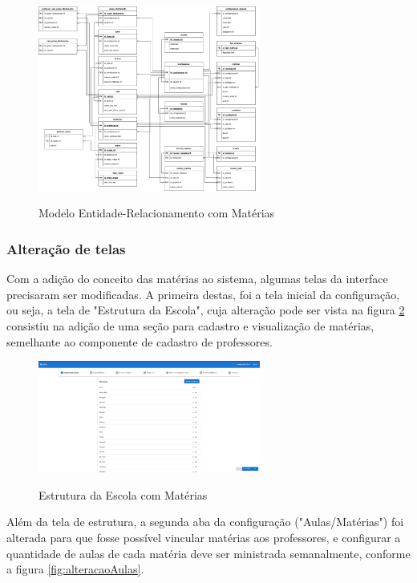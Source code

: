 \begin{figure}[!htb]
	\centering
	\caption{Modelo Entidade-Relacionamento com Matérias}
	\includegraphics[width=0.65\textwidth]{./dados/figuras/er_materias}
	\label{fig:modelagemMateiras}
\end{figure}
\pagebreak

\subsubsection{Alteração de telas}
Com a adição do conceito das matérias ao sistema, algumas telas da interface precisaram ser modificadas. A primeira destas, foi a tela inicial da configuração, ou seja, a tela de "Estrutura da Escola", cuja alteração pode ser vista na figura \ref{fig:estruturaAtualizada} consistiu na adição de uma seção para cadastro e visualização de matérias, semelhante ao componente de cadastro de professores.

\begin{figure}[!htb]
	\centering
	\caption{Estrutura da Escola com Matérias}
	\includegraphics[width=0.65\textwidth]{./dados/figuras/alteracaoEstrutura}
	\label{fig:estruturaAtualizada}
\end{figure}
\pagebreak

Além da tela de estrutura, a segunda aba da configuração ("Aulas/Matérias") foi alterada para que fosse possível vincular matérias aos professores, e configurar a quantidade de aulas de cada matéria deve ser ministrada semanalmente, conforme a figura \ref{fig:alteracaoAulas}.

